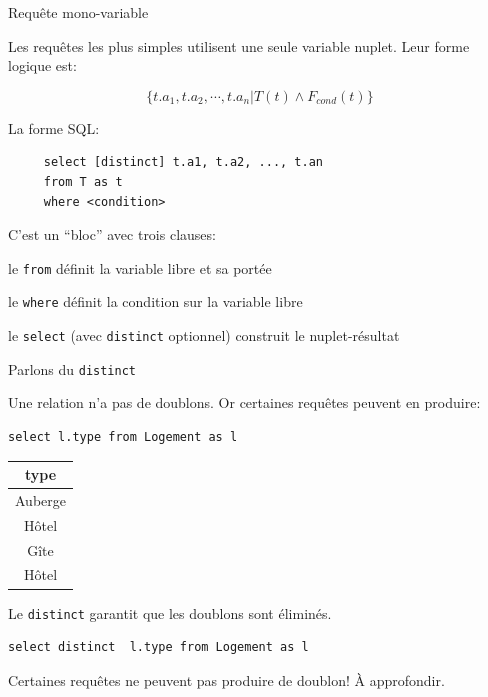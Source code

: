 \begin{frame}[fragile]{Requête mono-variable}

Les requêtes les plus simples utilisent une seule variable nuplet. 
Leur forme logique est:


 $$\{ t.a_1, t.a_2, \cdots, t.a_n | T(t) \land F_{cond}(t) \}$$
 
\vfill
La forme SQL:

\begin{verbatim}
     select [distinct] t.a1, t.a2, ..., t.an
     from T as t
     where <condition>
\end{verbatim}

\vfill

\begin{blocgauche}
C'est un ``bloc'' avec trois clauses:
\begin{redbullet}
   \item le \texttt{from} définit la variable libre et sa \alert{portée}
   \item  le \texttt{where} définit la condition sur la variable libre
   \item le \texttt{select} (avec \texttt{distinct} optionnel) construit le nuplet-résultat
\end{redbullet}

\end{blocgauche}
\end{frame}


\begin{frame}[fragile]{Parlons du \texttt{distinct}}

Une relation n'a pas de  doublons. Or certaines requêtes peuvent en produire:

\vfill

\begin{verbatim}
select l.type from Logement as l
\end{verbatim}

\vfill

\begin{tabular}{c}
\textbf{type}\\ \hline 
Auberge\\ \hline 
Hôtel\\ \hline 
Gîte\\ \hline 
Hôtel\\ \hline 
\end{tabular}

\vfill
Le \texttt{distinct} garantit que les doublons sont éliminés.
\vfill
\begin{verbatim}
select distinct  l.type from Logement as l
\end{verbatim}

\vfill

\begin{blocgauche}
Certaines requêtes ne peuvent pas produire de doublon! À approfondir.
\end{blocgauche}
\end{frame}



